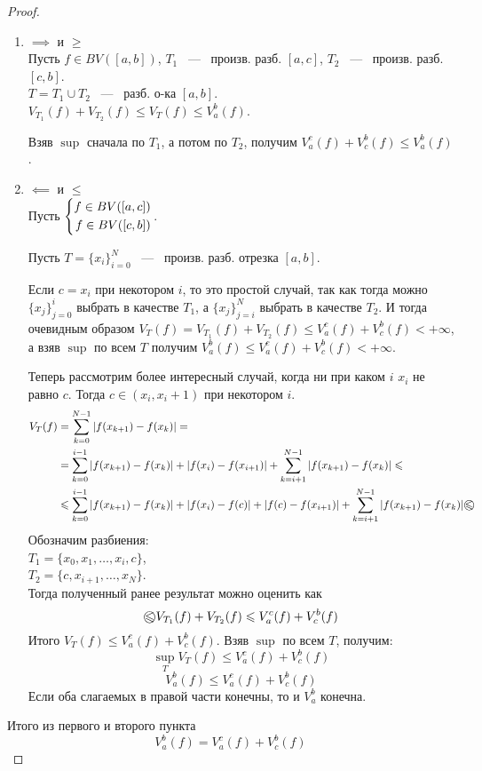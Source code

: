 \begin{proof} \ \\
	\begin{enumerate}
		\item $\implies$ и $\geq$\\
		
		Пусть $f \in BV([a, b])$, $T_1$ ~---~ произв. разб. $[a, c]$, $T_2$ ~---~ произв. разб. $[c, b]$.\\
		$T = T_1 \cup T_2$ ~---~ разб. о-ка $[a, b]$.\\
		$V_{T_1}(f) + V_{T_2}(f) \leq V_T(f) \leq V_a^b (f)$.
		
		Взяв $\sup$ сначала по $T_1$, а потом по $T_2$, получим $V_a^c (f) + V_c^b (f) \leq V_a^b (f)$.
		
		\item $\impliedby$ и $\leq$ \\
		
		Пусть $\left\{\begin{aligned}f \in BV([a, c]) \\ f \in BV([c, b])\end{aligned}\right.$.
		
		Пусть $T = \{x_i\}_{i=0}^N$ ~---~ произв. разб. отрезка $[a, b]$.
		
		Если $c = x_i$ при некотором $i$, то это простой случай, так как тогда можно $\{x_j\}_{j=0}^i$ выбрать в качестве $T_1$, а $\{x_j\}_{j=i}^N$ выбрать в качестве $T_2$. И тогда очевидным образом $V_T(f) = V_{T_1}(f) + V_{T_2} (f) \leq V_a^c(f) + V_c^b (f) < +\infty$, а взяв $\sup$ по всем $T$ получим $V_a^b(f) \leq V_a^c(f) + V_c^b (f) < +\infty$.
		
		Теперь рассмотрим более интересный случай, когда ни при каком $i$ $x_i$ не равно $c$. Тогда $c \in (x_i, x_i + 1)$ при некотором $i$.
		\[\begin{aligned}
			V_T(f)
			& = \sum_{k=0}^{N - 1} | f(x_{k+1}) - f(x_k) | = \\
			& =
			\sum_{k=0}^{i - 1} |f(x_{k+1}) - f(x_k)| + |f(x_i) - f(x_{i+1})| +
			\sum_{k=i+1}^{N-1} |f(x_{k+1}) - f(x_k)| \leq \\
			& \leq
			\sum_{k=0}^{i - 1} |f(x_{k+1}) - f(x_k)| + |f(x_i) - f(c)| + |f(c) - f(x_{i+1})| +
			\sum_{k=i+1}^{N-1} |f(x_{k+1}) - f(x_k)|
			\incirc{\leq}
		\end{aligned}\]
		Обозначим разбиения:\\
		$T_1 = \{x_0, x_1, \dots, x_i, c\}$,\\
		$T_2 = \{c, x_{i+1}, \dots, x_N\}$.\\
		Тогда полученный ранее результат можно оценить как
		\[
			\incirc{\leq} V_{T_1}(f) + V_{T_2}(f) \leq V_a^c(f) + V_c^b(f)
		\]
		Итого $V_T(f) \leq V_a^c(f) + V_c^b(f)$. Взяв $\sup$ по всем $T$, получим: \[
			\sup_T V_T(f) \leq V_a^c(f) + V_c^b(f)
		\]\[
			V_a^b(f) \leq V_a^c(f) + V_c^b(f)
		\]
		Если оба слагаемых в правой части конечны, то и $V_a^b$ конечна.
	\end{enumerate}
	
	Итого из первого и второго пункта \[
		V_a^b(f) = V_a^c(f) + V_c^b(f)
	\]
\end{proof}
